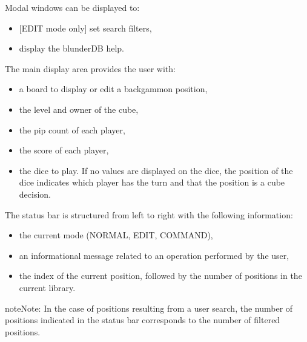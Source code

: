 \documentclass[letterpaper,10pt,english]{sphinxmanual}
\begin{document}
\sphinxAtStartPar
Modal windows can be displayed to:
\begin{itemize}
\item {} 
\sphinxAtStartPar
{[}EDIT mode only{]} set search filters,

\item {} 
\sphinxAtStartPar
display the blunderDB help.

\end{itemize}

\sphinxAtStartPar
The main display area provides the user with:
\begin{itemize}
\item {} 
\sphinxAtStartPar
a board to display or edit a backgammon position,

\item {} 
\sphinxAtStartPar
the level and owner of the cube,

\item {} 
\sphinxAtStartPar
the pip count of each player,

\item {} 
\sphinxAtStartPar
the score of each player,

\item {} 
\sphinxAtStartPar
the dice to play. If no values are displayed on the dice, the position of the dice indicates which player has the turn and that the position is a cube decision.

\end{itemize}

\sphinxAtStartPar
The status bar is structured from left to right with the following information:
\begin{itemize}
\item {} 
\sphinxAtStartPar
the current mode (NORMAL, EDIT, COMMAND),

\item {} 
\sphinxAtStartPar
an informational message related to an operation performed by the user,

\item {} 
\sphinxAtStartPar
the index of the current position, followed by the number of positions in the current library.

\end{itemize}

\begin{sphinxadmonition}{note}{Note:}
\sphinxAtStartPar
In the case of positions resulting from a user search, the number of positions indicated in the status bar corresponds to the number of filtered positions.
\end{sphinxadmonition}
\end{document}
